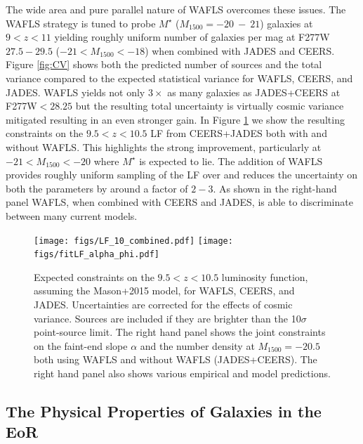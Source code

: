 \documentclass[12pt]{article}
\begin{document}
The wide area and pure parallel nature of WAFLS overcomes these issues. The WAFLS strategy is tuned to probe $M^{\star}$ ($M_{1500}=-20\ -\ 21$) galaxies at $9<z<11$ yielding roughly uniform number of galaxies per mag at F277W$27.5-29.5$ ($-21<M_{1500}<-18$) when combined with JADES and CEERS. Figure \ref{fig:CV} shows both the predicted number of sources and the total variance compared to the expected statistical variance for WAFLS, CEERS, and JADES. WAFLS yields not only $3\times$ as many galaxies as JADES+CEERS at F277W$<28.25$ but the resulting total uncertainty is virtually cosmic variance mitigated resulting in an even stronger gain. In Figure \ref{fig:LF} we show the resulting constraints on the $9.5<z<10.5$ LF from CEERS+JADES both with and without WAFLS. This highlights the strong improvement, particularly at $-21<M_{1500}<-20$ where $M^{\star}$ is expected to lie. The addition of WAFLS provides roughly uniform sampling of the LF over and reduces the uncertainty on both the parameters by around a factor of $2-3$. As shown in the right-hand panel WAFLS, when combined with CEERS and JADES, is able to discriminate between many current models. 

\begin{figure}[h!]
    \centering
    \texttt{[image: figs/LF\_10\_combined.pdf]}
    \texttt{[image: figs/fitLF\_alpha\_phi.pdf]}
    \vspace{-5mm}
    \caption{Expected constraints on the $9.5<z<10.5$ luminosity function, assuming the Mason+2015 model, for WAFLS, CEERS, and JADES. Uncertainties are corrected for the effects of cosmic variance. Sources are included if they are brighter than the 10$\sigma$ point-source limit. The right hand panel shows the joint constraints on the faint-end slope $\alpha$ and the number density at $M_{1500}=-20.5$ both using WAFLS and without WAFLS (JADES+CEERS). The right hand panel also shows various empirical and model predictions.}
    \label{fig:LF}
\end{figure}

\subsection*{The Physical Properties of Galaxies in the EoR}\label{sec:properties}
\end{document}
